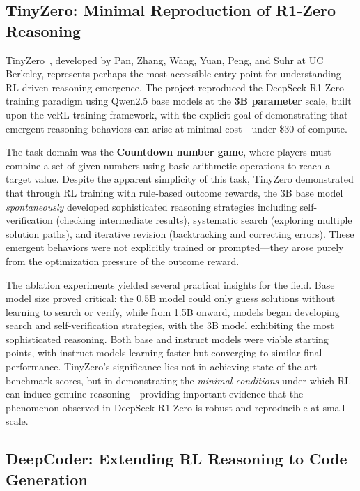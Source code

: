 \subsection*{TinyZero: Minimal Reproduction of R1-Zero Reasoning}

TinyZero~\cite{tinyzero2025}, developed by Pan, Zhang, Wang, Yuan, Peng, and Suhr at UC Berkeley, represents perhaps the most accessible entry point for understanding RL-driven reasoning emergence. The project reproduced the DeepSeek-R1-Zero training paradigm using Qwen2.5 base models at the \textbf{3B parameter} scale, built upon the veRL training framework, with the explicit goal of demonstrating that emergent reasoning behaviors can arise at minimal cost---under \$30 of compute.

The task domain was the \textbf{Countdown number game}, where players must combine a set of given numbers using basic arithmetic operations to reach a target value. Despite the apparent simplicity of this task, TinyZero demonstrated that through RL training with rule-based outcome rewards, the 3B base model \emph{spontaneously} developed sophisticated reasoning strategies including self-verification (checking intermediate results), systematic search (exploring multiple solution paths), and iterative revision (backtracking and correcting errors). These emergent behaviors were not explicitly trained or prompted---they arose purely from the optimization pressure of the outcome reward.

The ablation experiments yielded several practical insights for the field. Base model size proved critical: the 0.5B model could only guess solutions without learning to search or verify, while from 1.5B onward, models began developing search and self-verification strategies, with the 3B model exhibiting the most sophisticated reasoning. Both base and instruct models were viable starting points, with instruct models learning faster but converging to similar final performance. TinyZero's significance lies not in achieving state-of-the-art benchmark scores, but in demonstrating the \emph{minimal conditions} under which RL can induce genuine reasoning---providing important evidence that the phenomenon observed in DeepSeek-R1-Zero is robust and reproducible at small scale.

\subsection*{DeepCoder: Extending RL Reasoning to Code Generation}

